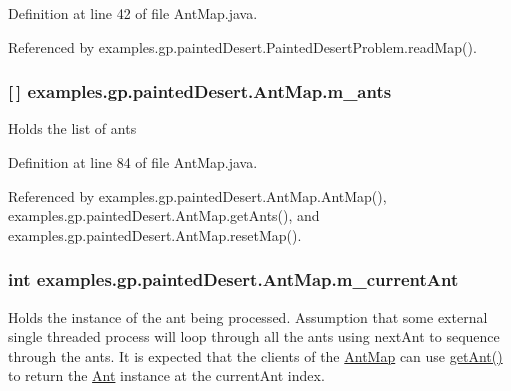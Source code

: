 Definition at line 42 of file Ant\-Map.\-java.



Referenced by examples.\-gp.\-painted\-Desert.\-Painted\-Desert\-Problem.\-read\-Map().

\hypertarget{classexamples_1_1gp_1_1painted_desert_1_1_ant_map_a57d23d277ed6f9ae95e8bf0d909bcdcd}{
\subsubsection[{m\-\_\-ants}]{ \mbox{[}$\,$\mbox{]} examples.\-gp.\-painted\-Desert.\-Ant\-Map.\-m\-\_\-ants\hspace{0.3cm}{\ttfamily [private]}}}\label{classexamples_1_1gp_1_1painted_desert_1_1_ant_map_a57d23d277ed6f9ae95e8bf0d909bcdcd}
Holds the list of ants 

Definition at line 84 of file Ant\-Map.\-java.



Referenced by examples.\-gp.\-painted\-Desert.\-Ant\-Map.\-Ant\-Map(), examples.\-gp.\-painted\-Desert.\-Ant\-Map.\-get\-Ants(), and examples.\-gp.\-painted\-Desert.\-Ant\-Map.\-reset\-Map().

\hypertarget{classexamples_1_1gp_1_1painted_desert_1_1_ant_map_a63111b71122dd708446f8145e6008b26}{
\subsubsection[{m\-\_\-current\-Ant}]{\setlength{\rightskip}{0pt plus 5cm}int examples.\-gp.\-painted\-Desert.\-Ant\-Map.\-m\-\_\-current\-Ant\hspace{0.3cm}{\ttfamily [private]}}}\label{classexamples_1_1gp_1_1painted_desert_1_1_ant_map_a63111b71122dd708446f8145e6008b26}
Holds the instance of the ant being processed. Assumption that some external single threaded process will loop through all the ants using next\-Ant to sequence through the ants. It is expected that the clients of the \hyperlink{classexamples_1_1gp_1_1painted_desert_1_1_ant_map}{Ant\-Map} can use \hyperlink{classexamples_1_1gp_1_1painted_desert_1_1_ant_map_ae915cb30323586695bf98a92701726db}{get\-Ant()} to return the \hyperlink{classexamples_1_1gp_1_1painted_desert_1_1_ant}{Ant} instance at the current\-Ant index. 

